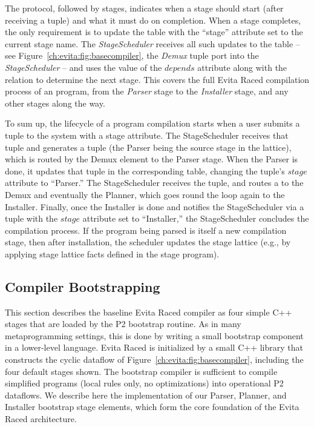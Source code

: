 The protocol, followed by stages, indicates when a stage should start (after
receiving a  tuple) and what it must do on
completion.  When a stage completes, the only requirement is to update the
 table with the ``stage'' attribute set to the current stage name.  The
{\em StageScheduler} receives all such updates to the  table -- see
Figure~\ref{ch:evita:fig:basecompiler}, the {\em Demux}  tuple port
into the {\em StageScheduler} -- and uses the value of the 
$depends$ attribute along with the  relation to determine the
next stage.  This covers the full Evita Raced compilation process of an
\OVERLOG program, from the {\em Parser} stage to the {\em Installer} stage, and
any other stages along the way.

To sum up, the lifecycle of a program compilation starts when a user submits a
 tuple to the system with a  stage attribute.  The
StageScheduler receives that  tuple and generates a
 tuple (the Parser being the source stage in the
lattice), which is routed by the Demux element to the Parser stage.  When the
Parser is done, it updates that  tuple in the corresponding table,
changing the tuple's $stage$ attribute to ``Parser.'' The StageScheduler
receives the  tuple, and routes a  to the
Demux and eventually the Planner, which goes round the loop again to
the Installer.  Finally, once the Installer is done and notifies the
StageScheduler via a  tuple with the $stage$ attribute set to
``Installer,'' the StageScheduler concludes the compilation process.  If the
\OVERLOG program being parsed is itself a new compilation stage, then after
installation, the scheduler updates the stage lattice (e.g., by applying 
stage lattice facts defined in the stage program).


\subsection{Compiler Bootstrapping}
\label{ch:evita:sec:bootstrap}

This section describes the baseline Evita Raced compiler as four simple C++
stages that are loaded by the P2 bootstrap routine.  As in many metaprogramming
settings, this is done by writing a small bootstrap component in a lower-level
language.  Evita Raced is initialized by a small C++ library that constructs
the cyclic dataflow of Figure~\ref{ch:evita:fig:basecompiler}, including the
four default stages shown.  The bootstrap compiler is sufficient to compile
simplified \OVERLOG programs (local rules only, no optimizations) into
operational P2 dataflows.  We describe here the implementation of our Parser,
Planner, and Installer bootstrap stage elements, which form the core foundation
of the Evita Raced architecture.

